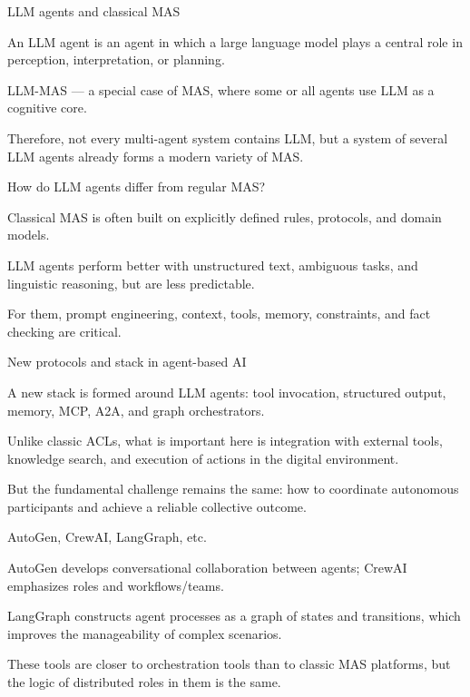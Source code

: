 \begin{frame}{LLM agents and classical MAS}
	\topline
	\justifying
	\begin{textitemize}
		\item An LLM agent is an agent in which a large language model plays a central role in perception, interpretation, or planning.
		\item LLM-MAS --- a special case of MAS, where some or all agents use LLM as a cognitive core.
		\item Therefore, not every multi-agent system contains LLM, but a system of several LLM agents already forms a modern variety of MAS.
	\end{textitemize}
\end{frame}

\begin{frame}{How do LLM agents differ from regular MAS?}
	\topline
	\justifying
	\begin{textitemize}
		\item Classical MAS is often built on explicitly defined rules, protocols, and domain models.
		\item LLM agents perform better with unstructured text, ambiguous tasks, and linguistic reasoning, but are less predictable.
		\item For them, prompt engineering, context, tools, memory, constraints, and fact checking are critical.
	\end{textitemize}
\end{frame}

\begin{frame}{New protocols and stack in agent-based AI}
	\topline
	\justifying
	\begin{textitemize}
		\item A new stack is formed around LLM agents: tool invocation, structured output, memory, MCP, A2A, and graph orchestrators.
		\item Unlike classic ACLs, what is important here is integration with external tools, knowledge search, and execution of actions in the digital environment.
		\item But the fundamental challenge remains the same: how to coordinate autonomous participants and achieve a reliable collective outcome.
	\end{textitemize}
\end{frame}

\begin{frame}{AutoGen, CrewAI, LangGraph, etc.}
	\topline
	\justifying
	\begin{textitemize}
		\item AutoGen develops conversational collaboration between agents; CrewAI emphasizes roles and workflows/teams.
		\item LangGraph constructs agent processes as a graph of states and transitions, which improves the manageability of complex scenarios.
		\item These tools are closer to orchestration tools than to classic MAS platforms, but the logic of distributed roles in them is the same.
	\end{textitemize}
\end{frame}

